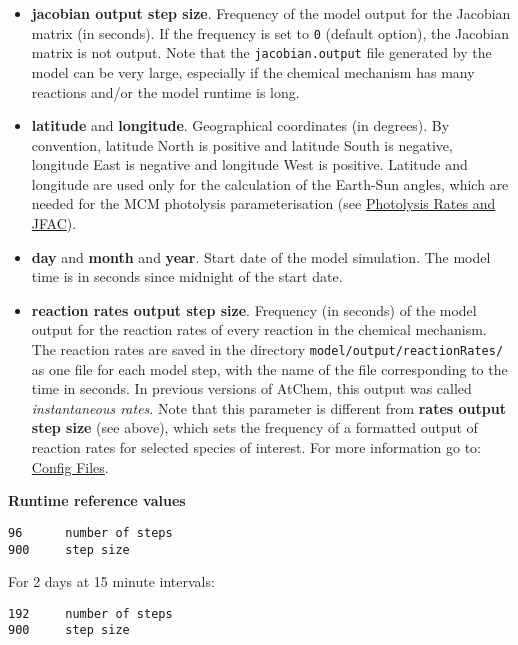 \begin{itemize}
{    size))}. \emph{Important}: if one or more variables are
  constrained, the interval between the model start time and the model
  stop time must be equal or shorter than the time interval of the
  constrained data (see \hyperref[sec:constraints]{Constraints}).
\item \textbf{jacobian output step size}. Frequency of the model
  output for the Jacobian matrix (in seconds). If the frequency is set
  to \texttt{0} (default option), the Jacobian matrix is not
  output. Note that the \texttt{jacobian.output} file generated by the
  model can be very large, especially if the chemical mechanism has
  many reactions and/or the model runtime is long.
\item \textbf{latitude} and \textbf{longitude}. Geographical
  coordinates (in degrees). By convention, latitude North is positive
  and latitude South is negative, longitude East is negative and
  longitude West is positive. Latitude and longitude are used only for
  the calculation of the Earth-Sun angles, which are needed for the
  MCM photolysis parameterisation (see
  \hyperref[sec:photolysis-rates]{Photolysis Rates and JFAC}).
\item \textbf{day} and \textbf{month} and \textbf{year}. Start date of
  the model simulation. The model time is in seconds since midnight of
  the start date.
\item \textbf{reaction rates output step size}. Frequency (in seconds)
  of the model output for the reaction rates of every reaction in the
  chemical mechanism. The reaction rates are saved in the directory
  \texttt{model/output/reactionRates/} as one file for each model
  step, with the name of the file corresponding to the time in
  seconds. In previous versions of AtChem, this output was called
  \emph{instantaneous rates}. Note that this parameter is different
  from \textbf{rates output step size} (see above), which sets the
  frequency of a formatted output of reaction rates for selected
  species of interest. For more information go to:
  \hyperref[sec:config-files]{Config Files}.
\end{itemize}

\textbf{Runtime reference values}

\begin{verbatim}
96      number of steps
900     step size
\end{verbatim}

For 2 days at 15 minute intervals:

\begin{verbatim}
192     number of steps
900     step size
\end{verbatim}

